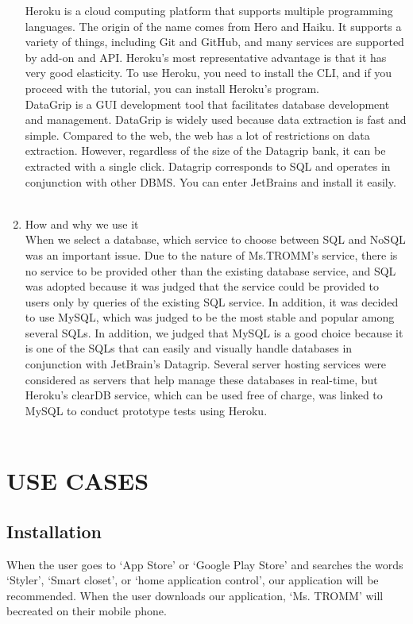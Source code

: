 \documentclass[conference]{IEEEtran}
\begin{document}
\begin{enumerate}
    Heroku is a cloud computing platform that supports multiple programming languages. The origin of the name comes from Hero and Haiku. It supports a variety of things, including Git and GitHub, and many services are supported by add-on and API. Heroku's most representative advantage is that it has very good elasticity. To use Heroku, you need to install the CLI, and if you proceed with the tutorial, you can install Heroku's program.\\
    DataGrip is a GUI development tool that facilitates database development and management. DataGrip is widely used because data extraction is fast and simple. Compared to the web, the web has a lot of restrictions on data extraction. However, regardless of the size of the Datagrip bank, it can be extracted with a single click. Datagrip corresponds to SQL and operates in conjunction with other DBMS. You can enter JetBrains and install it easily.\\ \\
    \item How and why we use it \\
    When we select a database, which service to choose between SQL and NoSQL was an important issue. Due to the nature of Ms.TROMM's service, there is no service to be provided other than the existing database service, and SQL was adopted because it was judged that the service could be provided to users only by queries of the existing SQL service. In addition, it was decided to use MySQL, which was judged to be the most stable and popular among several SQLs. In addition, we judged that MySQL is a good choice because it is one of the SQLs that can easily and visually handle databases in conjunction with JetBrain's Datagrip. Several server hosting services were considered as servers that help manage these databases in real-time, but Heroku's clearDB service, which can be used free of charge, was linked to MySQL to conduct prototype tests using Heroku. \\ \\
\end{enumerate}

\section{USE CASES}

\subsection{Installation}
When the user goes to ‘App Store' or ‘Google Play Store' and searches the words ‘Styler’, ‘Smart closet’, or ‘home application control’, our application will be recommended. When the user downloads our application, ‘Ms. TROMM’ will becreated on their mobile phone.\\ \\
\end{document}
